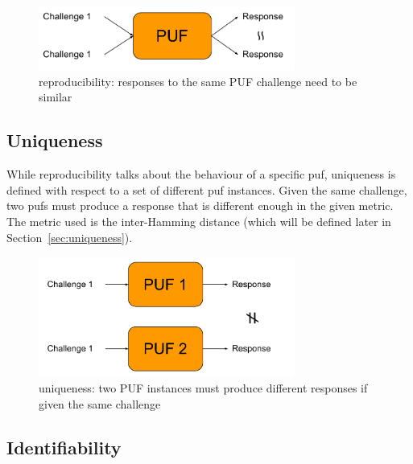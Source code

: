 \begin{figure}[h!]
    \centering
    \captionsetup{justification=centering,margin=0.5cm}
    \includegraphics[width=0.75\textwidth]{images/reproducibility}
    \caption[reproducibility: responses to the same PUF challenge need to be similar]{reproducibility: responses to the same PUF challenge need to be similar~\cite{Kodytek2017}}
    \label{fig:reproducibility}
\end{figure}

\subsection*{Uniqueness}

While reproducibility talks about the behaviour of a specific \gls{puf}, uniqueness is defined with respect to a set of different \gls{puf} instances. Given the same challenge, two \glspl{puf} must produce a response that is different enough in the given metric. The metric used is the inter-Hamming distance (which will be defined later in Section~\ref{sec:uniqueness}).

\begin{figure}[ht!]
    \centering
    \captionsetup{justification=centering,margin=0.5cm}
    \includegraphics[width=0.75\textwidth]{images/uniqueness}
    \caption[uniqueness: two PUF instances must produce different responses if given the same challenge]{uniqueness: two PUF instances must produce different responses if given the same challenge~\cite{Kodytek2017}}
    \label{fig:uniqueness}
\end{figure}

\subsection*{Identifiability}


